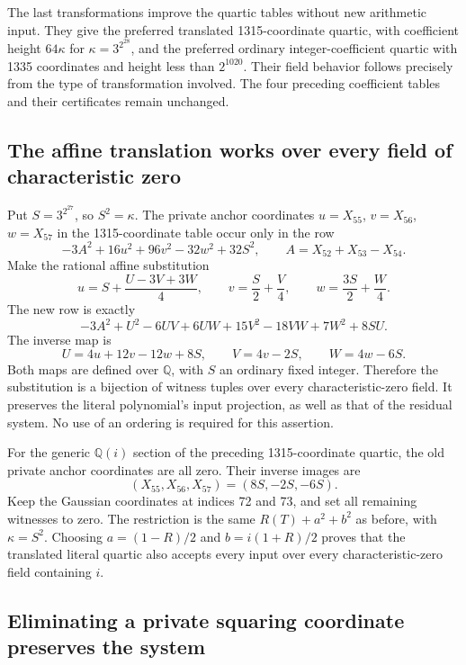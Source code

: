 \documentclass[11pt]{article}
\theoremstyle{definition}
\begin{document}
The last transformations improve the quartic tables without
new arithmetic input.  They give the preferred translated
1315-coordinate quartic, with coefficient height
$64\kappa$ for $\kappa=3^{2^{28}}$, and the preferred ordinary
integer-coefficient quartic with 1335 coordinates and height
less than $2^{1020}$.  Their field behavior follows precisely
from the type of transformation involved.  The four preceding
coefficient tables and their certificates remain unchanged.

\subsection{The affine translation works over every field of characteristic zero}

Put $S=3^{2^{27}}$, so $S^2=\kappa$.  The private anchor
coordinates $u=X_{55}$, $v=X_{56}$, $w=X_{57}$ in the
1315-coordinate table occur only in the row
\[
              -3A^2+16u^2+96v^2-32w^2+32S^2,
                    \qquad A=X_{52}+X_{53}-X_{54}.
\]
Make the rational affine substitution
\begin{equation}\label{eq:final-anchor-affine-map-v2}
 u=S+\frac{U-3V+3W}{4},\qquad
 v=\frac S2+\frac V4,\qquad
 w=\frac{3S}{2}+\frac W4.
\end{equation}
The new row is exactly
\[
 -3A^2+U^2-6UV+6UW+15V^2-18VW+7W^2+8SU.
\]
The inverse map is
\[
       U=4u+12v-12w+8S,\qquad V=4v-2S,
                                      \qquad W=4w-6S.
\]
Both maps are defined over $\mathbb Q$, with $S$ an ordinary
fixed integer.  Therefore the substitution is a bijection of
witness tuples over every characteristic-zero field.  It
preserves the literal polynomial's input projection, as well
as that of the residual system.  No use of an ordering is
required for this assertion.

For the generic $\mathbb Q(i)$ section of the preceding
1315-coordinate quartic, the old private anchor coordinates
are all zero.  Their inverse images are
\[
                   (X_{55},X_{56},X_{57})=(8S,-2S,-6S).
\]
Keep the Gaussian coordinates at indices 72 and 73, and set
all remaining witnesses to zero.  The restriction is the
same $R(T)+a^2+b^2$ as before, with $\kappa=S^2$.
Choosing $a=(1-R)/2$ and $b=i(1+R)/2$ proves that the
translated literal quartic also accepts every input over
every characteristic-zero field containing $i$.

\subsection{Eliminating a private squaring coordinate preserves the system}
\end{document}
